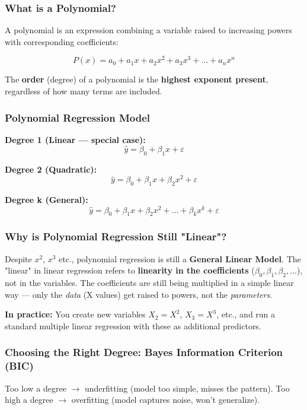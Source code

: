 \documentclass[12pt,openany]{book}
\begin{document}
\subsubsection{What is a Polynomial?}


A polynomial is an expression combining a variable raised to increasing powers with corresponding coefficients:

\[
P(x) = a_0 + a_1 x + a_2 x^2 + a_3 x^3 + \dots + a_n x^n
\]


The \textbf{order} (degree) of a polynomial is the \textbf{highest exponent present}, regardless of how many terms are included.

\subsubsection{Polynomial Regression Model}


\textbf{Degree 1 (Linear --- special case):}
\[
\hat{y} = \beta_0 + \beta_1 x + \varepsilon
\]


\textbf{Degree 2 (Quadratic):}
\[
\hat{y} = \beta_0 + \beta_1 x + \beta_2 x^2 + \varepsilon
\]


\textbf{Degree k (General):}
\[
\hat{y} = \beta_0 + \beta_1 x + \beta_2 x^2 + \dots + \beta_k x^k + \varepsilon
\]


\subsubsection{Why is Polynomial Regression Still "Linear"?}


Despite \(x^2\), \(x^3\) etc., polynomial regression is still a \textbf{General Linear Model}. The "linear" in linear regression refers to \textbf{linearity in the coefficients} (\(\beta_0, \beta_1, \beta_2, \dots\)), not in the variables. The coefficients are still being multiplied in a simple linear way --- only the \textit{data} (X values) get raised to powers, not the \textit{parameters}.

\textbf{In practice:} You create new variables \(X_2 = X^2\), \(X_3 = X^3\), etc., and run a standard multiple linear regression with these as additional predictors.

\subsubsection{Choosing the Right Degree: Bayes Information Criterion (BIC)}


Too low a degree \(\rightarrow\) underfitting (model too simple, misses the pattern).
Too high a degree \(\rightarrow\) overfitting (model captures noise, won't generalize).
\end{document}
